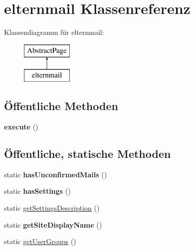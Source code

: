 \hypertarget{classelternmail}{}\section{elternmail Klassenreferenz}
\label{classelternmail}
Klassendiagramm für elternmail\+:\begin{figure}[H]
\begin{center}
\leavevmode
\includegraphics[height=2.000000cm]{classelternmail}
\end{center}
\end{figure}
\subsection*{Öffentliche Methoden}
\begin{DoxyCompactItemize}
\item 
\mbox{\label{classelternmail_a36a8294fe8ec61006613a37e079fe7a0}} 
{\bfseries execute} ()
\end{DoxyCompactItemize}
\subsection*{Öffentliche, statische Methoden}
\begin{DoxyCompactItemize}
\item 
\mbox{\label{classelternmail_ae801137b6f785f29505ce47f45278800}} 
static {\bfseries has\+Unconfirmed\+Mails} ()
\item 
\mbox{\label{classelternmail_ac601aa0adbd8d73ea674182cdb1a82b3}} 
static {\bfseries has\+Settings} ()
\item 
static \mbox{\hyperlink{classelternmail_ac73aa636b2a565daf700b8acda0c7a46}{get\+Settings\+Description}} ()
\item 
\mbox{\label{classelternmail_a7f96980d71108ae39794fe599dfa7019}} 
static {\bfseries get\+Site\+Display\+Name} ()
\item 
static \mbox{\hyperlink{classelternmail_a774a4cb2000dd8ee594d238716d27639}{get\+User\+Groups}} ()
\end{DoxyCompactItemize}
